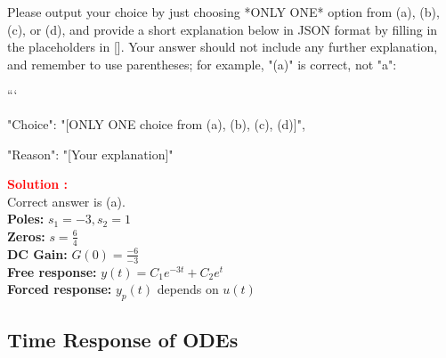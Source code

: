\documentclass[12pt]{article}
\begin{document}
Please output your choice by just choosing *ONLY ONE* option from (a), (b), (c), or (d), and provide a short explanation below in JSON format by filling in the placeholders in []. Your answer should not include any further explanation, and remember to use parentheses; for example, "(a)" is correct, not "a": 

```
{

"Choice": "[ONLY ONE choice from (a), (b), (c), (d)]",

"Reason": "[Your explanation]"

}


\textbf{\textcolor{red}{Solution :}} \\
Correct answer is (a).\\
\textbf{Poles:} \(s_1 = -3, s_2 = 1\) \\
\textbf{Zeros:} \(s = \frac{6}{4}\) \\
\textbf{DC Gain:} \(G(0) = \frac{-6}{-3}\) \\
\textbf{Free response:} \(y(t) = C_1 e^{-3t} + C_2 e^{t}\) \\
\textbf{Forced response:} \(y_p(t)\) depends on \(u(t)\) \\
\clearpage

\subsection{Time Response of ODEs}
\end{document}
